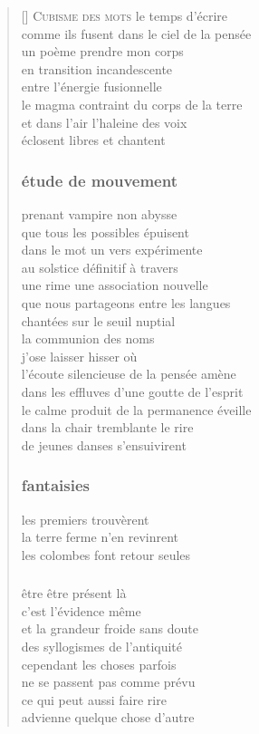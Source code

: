 \documentclass[a4paper, titlepage, twoside, 12pt]{book}
\begin{document}
\newpage

\vspace*{2cm}
\settowidth{\versewidth}{advienne quelque chose d'autre}
\begin{verse}[\versewidth]
{\lettrine[lines=1]{\textcolor[gray]{0.6}{C}}{\space ubisme des mots} le temps d'écrire}\\
comme ils fusent dans le ciel de la pensée\\
un poème prendre mon corps\\
en transition incandescente\\
entre l'énergie fusionnelle\\
le magma contraint du corps de la terre\\
et dans l'air l'haleine des voix\\
éclosent libres et chantent
\subsubsection*{étude de mouvement}
prenant vampire non abysse\\
que tous les possibles épuisent\\
dans le mot un vers expérimente\\
au solstice définitif à travers\\
une rime une association nouvelle\\
que nous partageons entre les langues\\
chantées sur le seuil nuptial\\
la communion des noms\\
j'ose laisser hisser où\\
l'écoute silencieuse de la pensée amène\\
dans les effluves d'une goutte de l'esprit\\
le calme produit de la permanence éveille\\
dans la chair tremblante le rire\\
de jeunes danses s'ensuivirent
\subsubsection*{fantaisies}
les premiers trouvèrent\\
la terre ferme n'en revinrent\\
les colombes font retour seules
\subsubsection*{}
être être présent là\\
c'est l'évidence même\\
et la grandeur froide sans doute\\
des syllogismes de l'antiquité\\
cependant les choses parfois\\
ne se passent pas comme prévu\\
ce qui peut aussi faire rire\\
advienne quelque chose d'autre

\end{verse}
\end{document}
